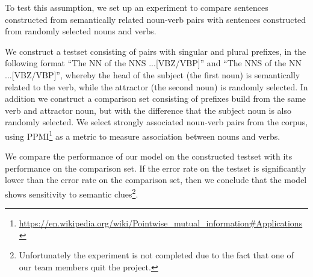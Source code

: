 To test this assumption,
we set up an experiment to compare 
sentences constructed from semantically related noun-verb pairs
with sentences constructed from randomly selected nouns and verbs. 

We construct a testset consisting of pairs with singular and plural prefixes, in the following format  
``The NN of the NNS ...[VBZ/VBP]'' and
``The NNS of the NN ...[VBZ/VBP]'', 
whereby the head of the subject (the first noun)
is semantically related to the verb, while the attractor (the second noun)
is randomly selected. 
In addition we construct a comparison set consisting of prefixes
build from the same verb and attractor noun,
but with the difference that the subject noun is also randomly selected.
We select strongly associated noun-verb pairs from the corpus,
using PPMI\footnote{
\url{https://en.wikipedia.org/wiki/Pointwise_mutual_information\#Applications}
} as a metric to measure association between nouns and verbs. 

We compare the performance of our model on
the constructed testset with its performance
on the comparison set.
If the error rate on the testset is significantly
lower than the error rate on the comparison set,
then we conclude that the model shows sensitivity to semantic clues\footnote{Unfortunately the experiment is not completed
due to the fact that one of our team members quit the project.}.




